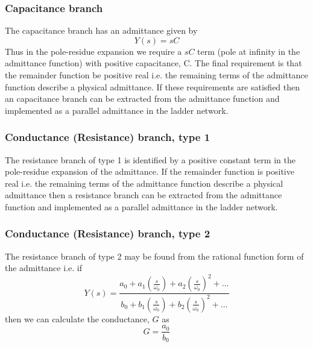 \subsubsection{Capacitance branch}

The capacitance branch has an admittance given by
\begin{equation} 
Y\left(s\right)=sC
\end{equation}
Thus in the pole-residue expansion we require a $sC$ term (pole at infinity in the admittance function) with positive capacitance, C.
The final requirement is that the remainder function be positive real i.e. the remaining terms of the admittance function describe a physical admittance. If these requirements are satisfied then an capacitance branch can be extracted from the admittance function and implemented as a parallel admittance in the ladder network. 

\subsubsection{Conductance (Resistance) branch, type 1}

The resistance branch of type 1 is identified by a positive constant term in the pole-residue expansion of the admittance. If the remainder function is positive real i.e. the remaining terms of the admittance function describe a physical admittance then a resistance branch can be extracted from the admittance function and implemented as a parallel admittance in the ladder network. 

\subsubsection{Conductance (Resistance) branch, type 2}

The resistance branch of type 2 may be found from the rational function form of the admittance i.e. if
%
\begin{equation} \label{eq:rational_function_G2}
Y\left(s\right)=\frac{a_{0}+a_{1}\left(\frac{s}{\omega_{0}}\right)+a_{2}\left(\frac{s}{\omega_{0}}\right)^{2}+\dots}{b_{0}+b_{1}\left(\frac{s}{\omega_{0}}\right)+b_{2}\left(\frac{s}{\omega_{0}}\right)^{2}+\dots}
\end{equation}
%
then we can calculate the conductance, $G$ as
%
\begin{equation} \label{eq:rational_function_G2b}
G=\frac{a_{0}}{b_{0}}
\end{equation}
%


\clearpage

